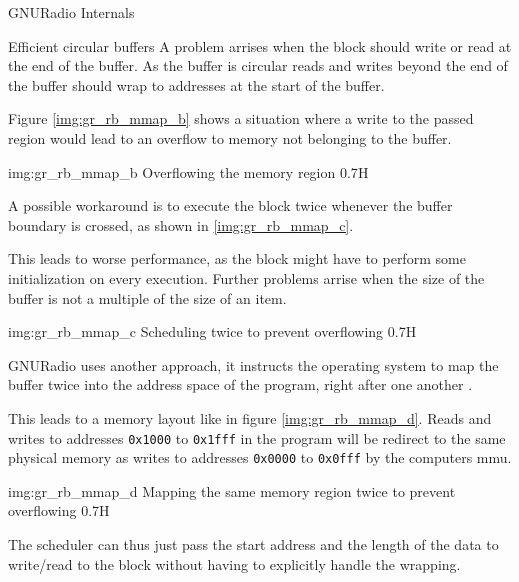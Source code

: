 \begin{subchapter}{GNURadio Internals}
\begin{subsubchapter}{Efficient circular buffers}
    A problem arrises when the block should write or read
    at the end of the buffer.
    As the buffer is circular reads and writes beyond the
    end of the buffer should wrap to addresses at the start of the
    buffer.

    Figure \ref{img:gr_rb_mmap_b} shows a situation where
    a write to the passed region would lead to an overflow
    to memory not belonging to the buffer.

                 {img:gr_rb_mmap_b}
                 {Overflowing the memory region}
                 {0.7}{H}

    A possible workaround is to execute the block
    twice whenever the buffer boundary is crossed,
    as shown in \ref{img:gr_rb_mmap_c}.

    This leads to worse performance, as the block might have
    to perform some initialization on every execution.
    Further problems arrise when the size of the buffer is not
    a multiple of the size of an item.

                 {img:gr_rb_mmap_c}
                 {Scheduling twice to prevent overflowing}
                 {0.7}{H}

    GNURadio uses another approach, it instructs the operating system
    to map the buffer twice into the address space of the program,
    right after one another \cite{grrdbufmmap}.

    This leads to a memory layout like in figure \ref{img:gr_rb_mmap_d}.
    Reads and writes to addresses \texttt{0x1000} to \texttt{0x1fff} in the program
    will be redirect to the same physical memory as writes to addresses
    \texttt{0x0000} to \texttt{0x0fff} by the computers \gls{mmu}.

                 {img:gr_rb_mmap_d}
                 {Mapping the same memory region twice to prevent overflowing}
                 {0.7}{H}

    The scheduler can thus just pass the start address and the length of
    the data to write/read to the block without having to explicitly handle
    the wrapping.
  \end{subsubchapter}
\end{subchapter}
